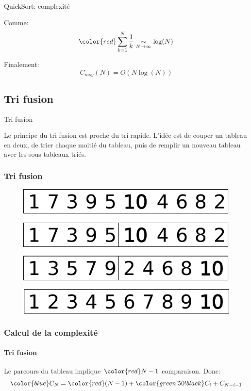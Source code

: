 \begin{frame}{QuickSort: complexité}

 Comme:
	$$\color{red} \sum_{k=1}^{N} \frac{1}{k}\underset{N \rightarrow \infty}{\sim} \log(N) $$

 Finalement:
$$\boxed{C_{moy}(N) = O(N \log(N))}$$

\end{frame}


\subsection{Tri fusion}

\begin{frame}{Tri fusion}

Le principe du tri fusion est proche du tri rapide. L'idée est de couper un tableau en deux, de trier chaque moitié du tableau, puis de remplir un nouveau tableau avec les sous-tableaux triés.

\end{frame}

\begin{frame}
 \frametitle{Tri fusion}

\begin{figure}
\centering
\includegraphics[width = 0.7\linewidth]{./images/fusion.pdf}
\end{figure}
\end{frame}

\begin{frame}
\frametitle{Calcul de la complexité}
\framesubtitle{Tri fusion}

Le parcours du tableau implique $\color{red} N-1$ comparaison. Donc:
$$ {\color{blue} C_N} = {\color{red} (N-1)} + {\color{green!50!black} C_i + C_{N-i-1}}$$
\end{frame}

